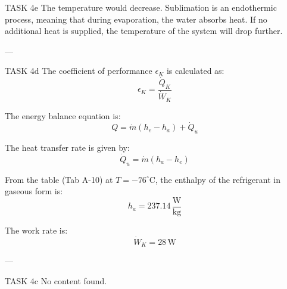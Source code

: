 TASK 4e  
The temperature would decrease. Sublimation is an endothermic process, meaning that during evaporation, the water absorbs heat. If no additional heat is supplied, the temperature of the system will drop further.

---

TASK 4d  
The coefficient of performance \( \epsilon_K \) is calculated as:  
\[
\epsilon_K = \frac{\dot{Q}_K}{\dot{W}_K}
\]

The energy balance equation is:  
\[
Q = \dot{m}(h_e - h_a) + \dot{Q}_u
\]

The heat transfer rate is given by:  
\[
\dot{Q}_u = \dot{m}(h_a - h_e)
\]

From the table (Tab A-10) at \( T = -76^\circ \text{C} \), the enthalpy of the refrigerant in gaseous form is:  
\[
h_a = 237.14 \, \frac{\text{W}}{\text{kg}}
\]

The work rate is:  
\[
\dot{W}_K = 28 \, \text{W}
\]

---

TASK 4c  
No content found.